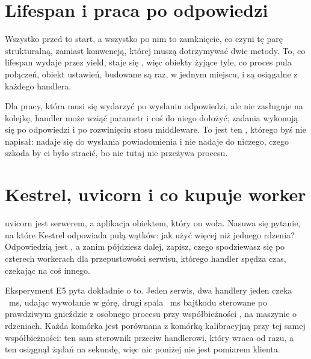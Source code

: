 \section{Lifespan i praca po odpowiedzi}
\label{sec:ch09-lifespan}


\noindent
Wszystko przed  to start, a wszystko po nim to zamknięcie, co
czyni tę parę strukturalną, zamiast konwencją, której muszą dotrzymywać dwie
metody. To, co lifespan wydaje przez yield, staje się ,
więc obiekty żyjące tyle, co proces \dash{} pula połączeń, obiekt ustawień,
 \dash{} budowane są raz, w jednym miejscu, i są
osiągalne z każdego handlera.

Dla pracy, która musi się wydarzyć po wysłaniu odpowiedzi, ale nie zasługuje
na kolejkę, handler może wziąć parametr  i coś do niego
dołożyć; zadania wykonują się po odpowiedzi i po rozwinięciu stosu
middleware. To jest ten , którego byś nie napisał: nadaje
się do wysłania powiadomienia i nie nadaje do niczego, czego szkoda by ci było
stracić, bo nic tutaj nie przeżywa procesu.

\section{Kestrel, uvicorn i co kupuje worker}
\label{sec:ch09-workers}

uvicorn jest serwerem, a aplikacja obiektem, który on woła. Nasuwa się
pytanie, na które Kestrel odpowiada pulą wątków: jak użyć więcej niż jednego
rdzenia? Odpowiedzią jest , a zanim pójdziesz dalej, zapisz,
czego spodziewasz się po czterech workerach dla przepustowości serwisu,
którego handler spędza czas, czekając na coś innego.

Eksperyment E5 pyta dokładnie o to. Jeden serwis, dwa handlery \dash{} jeden
czeka ~ms, udając wywołanie w górę, drugi spala
~ms bajtkodu \dash{} sterowane po prawdziwym gnieździe z
osobnego procesu przy współbieżności , na maszynie o
 rdzeniach. Każda komórka jest porównana z komórką
kalibracyjną przy tej samej współbieżności: ten sam sterownik przeciw
handlerowi, który wraca od razu, a ten osiągnął  żądań na
sekundę, więc nic poniżej nie jest pomiarem klienta.

